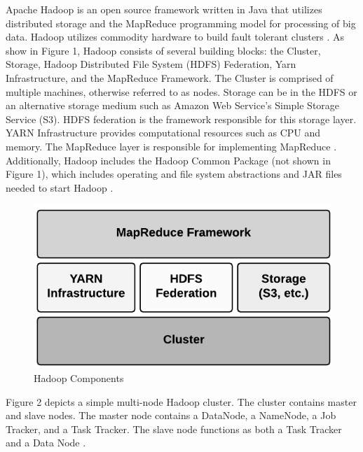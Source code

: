 \documentclass[9pt,twocolumn,twoside]{../../styles/osajnl}
\begin{document}
Apache Hadoop is an open source framework written in Java that utilizes distributed storage and the MapReduce programming model for processing of big data. Hadoop utilizes commodity hardware to build fault tolerant clusters \cite{www-wikihadoop}. 
As show in Figure 1, Hadoop consists of several building blocks: the Cluster, Storage, Hadoop Distributed File System (HDFS) Federation, Yarn Infrastructure, and the MapReduce Framework.  The Cluster is comprised of multiple machines, otherwise referred to as nodes.  Storage can be in the HDFS or an alternative storage medium such as Amazon Web Service's Simple Storage Service (S3).  HDFS federation is the framework responsible for this storage layer.  YARN Infrastructure provides computational resources such as CPU and memory. The MapReduce layer is responsible for implementing MapReduce \cite{www-hadooparch2}. Additionally, Hadoop includes the Hadoop Common Package (not shown in Figure 1), which includes operating and file system abstractions and JAR files needed to start Hadoop \cite{www-wikihadoop}.


\begin{figure}[ht]
  \includegraphics[scale=1.00]{images/hadoop-architecture2.jpg}
  \caption{Hadoop Components \cite{www-hadooparch2}}
\end{figure}

Figure 2 depicts a simple multi-node Hadoop cluster. The cluster contains master and slave nodes.  The master node contains a DataNode, a NameNode, a Job Tracker, and a Task Tracker. The slave node functions as both a Task Tracker and a Data Node \cite{www-hadooparch2}.
\end{document}
